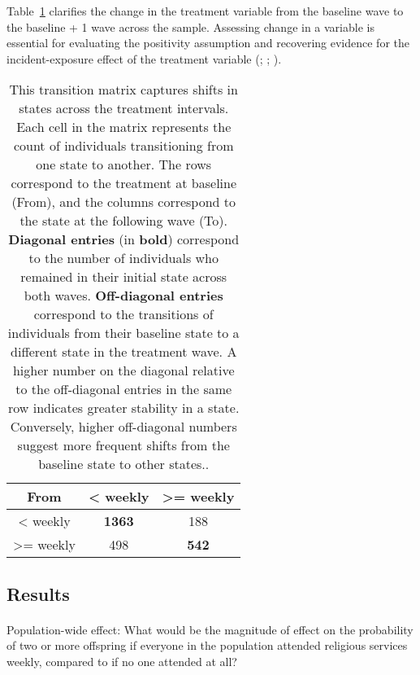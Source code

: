 \documentclass[
  single column]{article}
\makeatletter
\let\oldparagraph\paragraph
\renewcommand{\paragraph}{
    \@ifstar
      \xxxParagraphStar
      \xxxParagraphNoStar
  }
\newcommand{\xxxParagraphStar}[1]{\oldparagraph*{#1}\mbox{}}
\newcommand{\xxxParagraphNoStar}[1]{\oldparagraph{#1}\mbox{}}
\makeatother
\begin{document}
Table~\ref{tbl-transition} clarifies the change in the treatment
variable from the baseline wave to the baseline + 1 wave across the
sample. Assessing change in a variable is essential for evaluating the
positivity assumption and recovering evidence for the incident-exposure
effect of the treatment variable (; ;
).

\begin{longtable}[]{@{}ccc@{}}

\caption{\label{tbl-transition}This transition matrix captures shifts in
states across the treatment intervals. Each cell in the matrix
represents the count of individuals transitioning from one state to
another. The rows correspond to the treatment at baseline (From), and
the columns correspond to the state at the following wave (To).
\textbf{Diagonal entries} (in \textbf{bold}) correspond to the number of
individuals who remained in their initial state across both waves.
\textbf{Off-diagonal entries} correspond to the transitions of
individuals from their baseline state to a different state in the
treatment wave. A higher number on the diagonal relative to the
off-diagonal entries in the same row indicates greater stability in a
state. Conversely, higher off-diagonal numbers suggest more frequent
shifts from the baseline state to other states..}

\tabularnewline

\toprule\noalign{}
From & \textless{} weekly & \textgreater= weekly \\
\midrule\noalign{}
\endhead
\bottomrule\noalign{}
\endlastfoot
\textless{} weekly & \textbf{1363} & 188 \\
\textgreater= weekly & 498 & \textbf{542} \\

\end{longtable}

\newpage{}

\subsection{Results}\label{results}

\paragraph{Population-wide effect: What would be the magnitude of effect
on the probability of two or more offspring if everyone in the
population attended religious services weekly, compared to if no one
attended at
all?}\label{population-wide-effect-what-would-be-the-magnitude-of-effect-on-the-probability-of-two-or-more-offspring-if-everyone-in-the-population-attended-religious-services-weekly-compared-to-if-no-one-attended-at-all}
\end{document}
